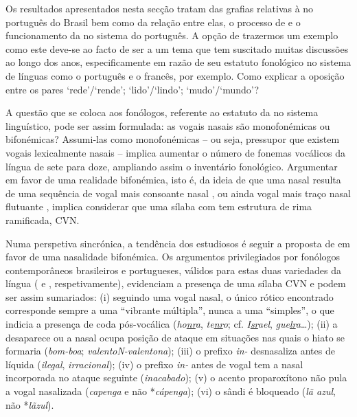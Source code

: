 \documentclass[output=paper]{LSP/langsci}
\begin{document}
Os resultados apresentados nesta secção tratam das grafias relativas à  no português do Brasil bem como da relação entre elas, o processo de  e o funcionamento da  no sistema do português. A opção de trazermos um exemplo como este deve-se ao facto de ser a  um tema que tem suscitado muitas discussões ao longo dos anos, especificamente em razão de seu estatuto fonológico no sistema de línguas como o português e o francês, por exemplo. Como explicar a oposição entre os pares `rede'/`rende'; `lido'/`lindo'; `mudo'/`mundo'?

A questão que se coloca aos fonólogos, referente ao estatuto da  no sistema linguístico, pode ser assim formulada: as vogais nasais são monofonémicas ou bifonémicas? Assumi-las como monofonémicas \citep{pontes1972} -- ou seja, pressupor que existem vogais lexicalmente nasais -- implica aumentar o número de fonemas vocálicos da língua de sete para doze, ampliando assim o inventário fonológico. Argumentar em favor de uma realidade bifonémica, isto é, da ideia de que uma nasal resulta de uma sequência de vogal mais consoante nasal \citep{camarajunior1970,bisol1999}, ou ainda vogal mais traço nasal flutuante \citep{mateusdandrade2000}, implica considerar que uma sílaba com  tem estrutura de rima ramificada, CVN. 

Numa perspetiva sincrónica, a tendência dos estudiosos é seguir a proposta de \citet{camarajunior1970} em favor de uma nasalidade bifonémica. Os argumentos privilegiados por fonólogos contemporâneos brasileiros e portugueses, válidos para estas duas variedades da língua (\citet{bisol1999} e \citet{mateusdandrade2000}, respetivamente), evidenciam a presença de uma sílaba CVN e podem ser assim sumariados: (i) seguindo uma vogal nasal, o único rótico encontrado corresponde sempre a uma ``vibrante múltipla'', nunca a uma ``simples'', o que indicia a presença de coda pós-vocálica (\textit{ho\underline{nr}a}, \textit{te\underline{nr}o}; cf. \textit{I\underline{sr}ael}, \textit{gue\underline{lr}a}\ldots); (ii) a  desaparece ou a nasal ocupa posição de ataque em situações nas quais o hiato se formaria (\textit{bom-boa}; \textit{valentoN-valentona}); (iii) o prefixo \textit{in-} desnasaliza antes de líquida (\textit{ilegal}, \textit{irracional}); (iv) o prefixo \textit{in-} antes de vogal tem a nasal incorporada no ataque seguinte (\textit{inacabado}); (v) o acento proparoxítono não pula a vogal nasalizada (\textit{capenga} e não *\textit{cápenga}); (vi) o sândi é bloqueado (\textit{lã azul}, não *\textit{lãzul}).
\end{document}

